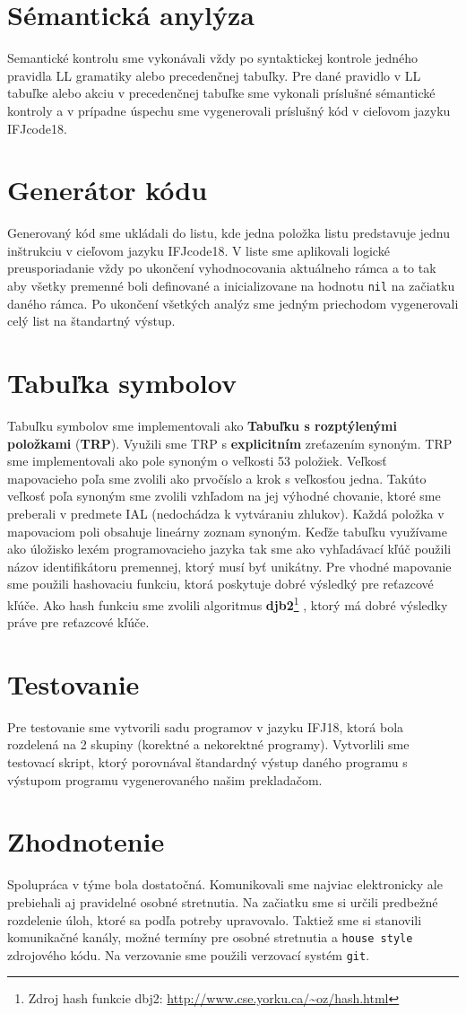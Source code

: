 \documentclass[a4paper, 11pt]{article}
\begin{document}
\section{Sémantická anylýza}
Semantické kontrolu sme vykonávali vždy po syntaktickej kontrole jedného pravidla LL gramatiky alebo precedenčnej tabuľky. Pre dané pravidlo v LL tabuľke alebo akciu v precedenčnej tabuľke sme vykonali príslušné sémantické kontroly a v prípadne úspechu sme vygenerovali príslušný kód v cieľovom jazyku IFJcode18.

\section{Generátor kódu}
Generovaný kód sme ukládali do listu, kde jedna položka listu predstavuje jednu inštrukciu v cieľovom jazyku IFJcode18. V liste sme aplikovali logické preusporiadanie vždy po ukončení vyhodnocovania aktuálneho rámca a to tak aby všetky premenné boli definované a inicializovane na hodnotu \texttt{nil} na začiatku daného rámca. Po ukončení všetkých analýz sme jedným priechodom vygenerovali celý list na štandartný výstup.
\section{Tabuľka symbolov}
Tabuľku symbolov sme implementovali ako \textbf{Tabuľku s rozptýlenými položkami} (\textbf{TRP}). Využili sme TRP s \textbf{explicitním} zreťazením synoným. TRP sme implementovali ako pole synoným o veľkosti 53 položiek. Veľkosť mapovacieho poľa sme zvolili ako prvočíslo a krok s veľkosťou jedna. Takúto veľkosť poľa synoným sme zvolili vzhľadom na jej výhodné chovanie, ktoré sme preberali v predmete IAL (nedochádza k vytváraniu zhlukov). Každá položka v mapovaciom poli obsahuje lineárny zoznam synoným. Keďže tabuľku využívame ako úložisko lexém programovacieho jazyka tak sme ako vyhľadávací kľúč použili názov identifikátoru premennej, ktorý musí byť unikátny. Pre vhodné mapovanie sme použili hashovaciu funkciu, ktorá poskytuje dobré výsledký pre reťazcové kľúče. Ako hash funkciu sme zvolili algoritmus \textbf{djb2}\footnote{Zdroj hash funkcie dbj2: 
	\url{http://www.cse.yorku.ca/~oz/hash.html}}
, ktorý má dobré výsledky práve pre reťazcové kľúče.
\section{Testovanie}
Pre testovanie sme vytvorili sadu programov v jazyku IFJ18, ktorá bola rozdelená na 2 skupiny (korektné a nekorektné programy). Vytvorlili sme testovací skript, ktorý porovnával štandardný výstup daného programu s výstupom programu vygenerovaného našim prekladačom.
\section{Zhodnotenie}
Spolupráca v týme bola dostatočná. Komunikovali sme najviac elektronicky ale prebiehali aj pravidelné osobné stretnutia. Na začiatku sme si určili predbežné rozdelenie úloh, ktoré sa podľa potreby upravovalo. Taktiež sme si stanovili komunikačné kanály, možné termíny pre osobné stretnutia a \texttt{house style} zdrojového kódu. Na verzovanie sme použili verzovací systém \texttt{git}.
\end{document}
